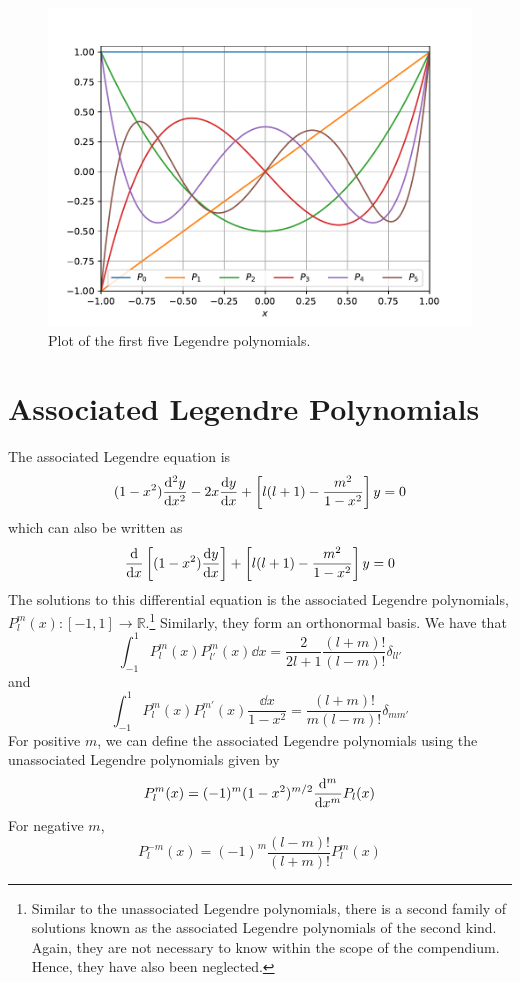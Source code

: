\documentclass[oneside]{book}
\numberwithin{figure}{section}
\numberwithin{equation}{section}
\theoremstyle{definition}
\begin{document}
	\begin{figure}[H]
		\centering
		\includegraphics[width=0.75\columnwidth]{Figures/Legendre/Legendre_Plot.pdf}
		\caption{Plot of the first five Legendre polynomials.}
	\end{figure}

	\section{Associated Legendre Polynomials}
	The associated Legendre equation is
	\begin{equation}
		(1 - x^2)\dv[2]{y}{x} - 2x\dv{y}{x} + \left[l(l + 1) - \dfrac{m^2}{1 - x^2}\right]y = 0
	\end{equation}
	which can also be written as
	\begin{equation}
		\dv{x}\left[(1 - x^2)\dv{y}{x}\right] + \left[l(l + 1) - \dfrac{m^2}{1 - x^2}\right]y = 0
	\end{equation}
	The solutions to this differential equation is the associated Legendre polynomials, $ P_l^m(x) : [-1,1] \to \mathbb{R} $.\footnote{Similar to the unassociated Legendre polynomials, there is a second family of solutions known as the associated Legendre polynomials of the second kind. Again, they are not necessary to know within the scope of the compendium. Hence, they have also been neglected.} Similarly, they form an orthonormal basis. We have that
	\begin{equation}
		\int_{-1}^{1}P_l^m(x)P_{l'}^m(x)\dd{x} = \dfrac{2}{2l + 1}\dfrac{(l + m)!}{(l - m)!}\delta_{ll'}
	\end{equation}
	and
	\begin{equation}
		\int_{-1}^{1}P_l^m(x)P_l^{m'}(x)\dfrac{\dd{x}}{1 - x^2} = \dfrac{(l + m)!}{m(l - m)!}\delta_{mm'}
	\end{equation}
	For positive $ m $, we can define the associated Legendre polynomials using the unassociated Legendre polynomials given by
	\begin{equation}
		P_l^m(x) = (-1)^m(1 - x^2)^{m/2}\dv[m]{x}P_l(x)
	\end{equation}
	For negative $ m $,
	\begin{equation}
		P_l^{-m}(x) = (-1)^m\dfrac{(l - m)!}{(l + m)!}P_l^m(x)
	\end{equation}
	
\end{document}
